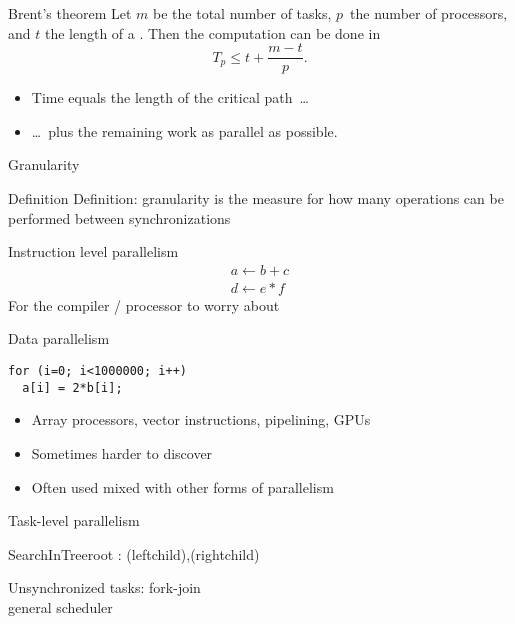 \begin{numberedframe}{Brent's theorem}
    Let $m$ be the total number of tasks, $p$~the number of processors,
  and $t$ the length of a . Then
  the computation can be done in \[ T_p \leq t +\frac{m-t}{p}. \]

  \begin{itemize}
  \item Time equals the length of the critical path~\ldots
  \item \ldots~plus the remaining work as parallel as possible.
  \end{itemize}
\end{numberedframe}

 {Granularity}

\begin{numberedframe}{Definition}
  Definition: granularity is the measure for how many 
  operations can be performed between synchronizations
\end{numberedframe}

\begin{numberedframe}{Instruction level parallelism}
\[ 
\begin{array}{l}
  a\leftarrow b+c\\ d\leftarrow e*f
\end{array}
\]
For the compiler / processor to worry about
\end{numberedframe}

\begin{numberedframe}{Data parallelism}
\begin{lstlisting}
for (i=0; i<1000000; i++)
  a[i] = 2*b[i];
\end{lstlisting}
\begin{itemize}
\item Array processors, vector instructions, pipelining, GPUs
\item Sometimes harder to discover
\item Often used mixed with other forms of parallelism
\end{itemize}
\end{numberedframe}

\begin{numberedframe}{Task-level parallelism}
  \begin{displayprocedure}{SearchInTree}{root}
  {\parl: \search(leftchild),\search(rightchild)}
\end{displayprocedure}

Unsynchronized tasks: fork-join\\
general scheduler

\begin{displayalgorithm}
\end{displayalgorithm}
\end{numberedframe}

